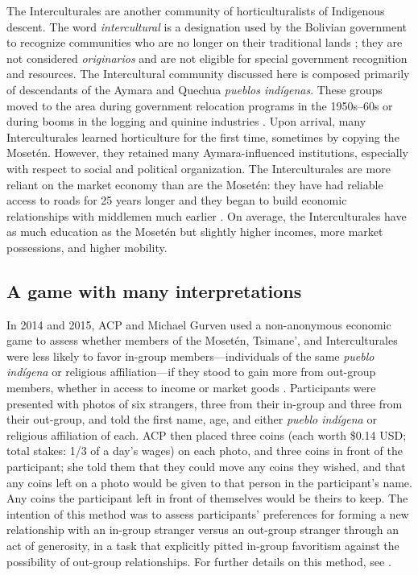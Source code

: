 \documentclass[bibauthoryear]{aa}
\begin{document}
The Interculturales are another community of horticulturalists of Indigenous descent. The word \textit{intercultural} is a designation used by the Bolivian government to recognize communities who are no longer on their traditional lands \citep{albo2007bolivia}; they are not considered \textit{originarios} and are not eligible for special government recognition and resources. The Intercultural community discussed here is composed primarily of descendants of the Aymara and Quechua \textit{pueblos ind\'igenas}. These groups moved to the area during government relocation programs in the 1950s--60s or during booms in the logging and quinine industries  \citep{pisor2016risk, pisor2018diversify}. Upon arrival, many Interculturales learned horticulture for the first time, sometimes by copying the Moset\'en. However, they retained many Aymara-influenced institutions, especially with respect to social and political organization. The Interculturales are more reliant on the market economy than are the Moset\'en: they have had reliable access to roads for 25 years longer \citep{Llojlla2011} and they began to build economic relationships with middlemen much earlier \citep{pisorjones2020}. On average, the Interculturales have as much education as the Moset\'en but slightly higher incomes, more market possessions, and higher mobility.
		  

\subsection{A game with many interpretations}\label{boliviagame}

In 2014 and 2015, ACP and Michael Gurven used a non-anonymous economic game to assess whether members of the Moset\'en, Tsimane', and Interculturales were less likely to favor in-group members---individuals of the same \textit{pueblo ind\'igena} or religious affiliation---if they stood to gain more from out-group members, whether in access to income or  market goods \citep{pisor2016risk, pisor2018diversify}. %
 Participants were presented with photos of six strangers, three from their in-group and three from their out-group, and told the first name, age, and either \textit{pueblo ind\'igena} or religious affiliation of each. ACP then placed three coins (each worth \$0.14 USD; total stakes: 1/3 of a day's wages) on each photo, and three coins in front of the participant; she told them that they could move any coins they wished, and that any coins left on a photo would be given to that person in the participant's name. Any coins the participant left in front of themselves would be theirs to keep. The intention of this method was to assess participants' preferences for forming a new relationship with an in-group stranger versus an out-group stranger through an act of generosity, in a task that explicitly pitted in-group favoritism against the possibility of out-group relationships. For further details on this method, see \citet{pisor2016risk, pisor2018diversify}.
\end{document}
